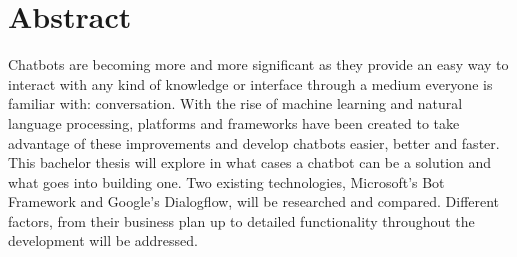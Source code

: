 \chapter*{Abstract}

Chatbots are becoming more and more significant as they provide an easy way to interact with any kind of knowledge or interface through a medium everyone is familiar with: conversation. With the rise of machine learning and natural language processing, platforms and frameworks have been created to take advantage of these improvements and develop chatbots easier, better and faster. This bachelor thesis will explore in what cases a chatbot can be a solution and what goes into building one. Two existing technologies, Microsoft's Bot Framework and Google's Dialogflow, will be researched and compared. Different factors, from their business plan up to detailed functionality throughout the development will be addressed.